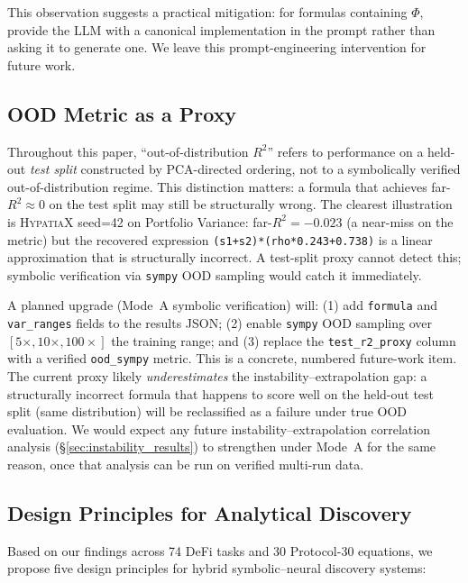\documentclass[twoside,11pt]{article}
\newcommand{\Rsq}{R^{2}}
\begin{document}
This observation suggests a practical mitigation: for formulas containing $\Phi$,
provide the LLM with a canonical implementation in the prompt rather than asking it
to generate one.  We leave this prompt-engineering intervention for future work.

\subsection{OOD Metric as a Proxy}\label{subsec:ood-metric-as-a-proxy}
\label{sec:ood_proxy}

Throughout this paper, ``out-of-distribution $\Rsq$'' refers to performance on a
held-out \emph{test split} constructed by PCA-directed ordering, not to a
symbolically verified out-of-distribution regime.  This distinction matters: a
formula that achieves far-$\Rsq \approx 0$ on the test split may still be
structurally wrong.  The clearest illustration is \textsc{HypatiaX} seed=42 on
Portfolio Variance: far-$\Rsq = -0.023$ (a near-miss on the metric) but the
recovered expression \texttt{(s1+s2)*(rho*0.243+0.738)} is a linear approximation
that is structurally incorrect.  A test-split proxy cannot detect this; symbolic
verification via \texttt{sympy} OOD sampling would catch it immediately.

A planned upgrade (Mode~A symbolic verification) will: (1) add \texttt{formula} and
\texttt{var\_ranges} fields to the results JSON; (2) enable \texttt{sympy} OOD
sampling over $[5\times, 10\times, 100\times]$ the training range; and (3) replace
the \texttt{test\_r2\_proxy} column with a verified \texttt{ood\_sympy} metric.
This is a concrete, numbered future-work item.  The current proxy likely
\emph{underestimates} the instability--extrapolation gap: a structurally incorrect
formula that happens to score well on the held-out test split (same distribution)
will be reclassified as a failure under true OOD evaluation. We would expect any
future instability--extrapolation correlation analysis (\S\ref{sec:instability_results})
to strengthen under Mode~A for the same reason, once that analysis can be run on
verified multi-run data.

\subsection{Design Principles for Analytical Discovery}\label{subsec:design-principles-for-analytical-discove}
\label{sec:disc_principles}

Based on our findings across 74 DeFi tasks and 30 Protocol-30 equations, we propose five design principles for hybrid symbolic--neural discovery systems:
\end{document}
